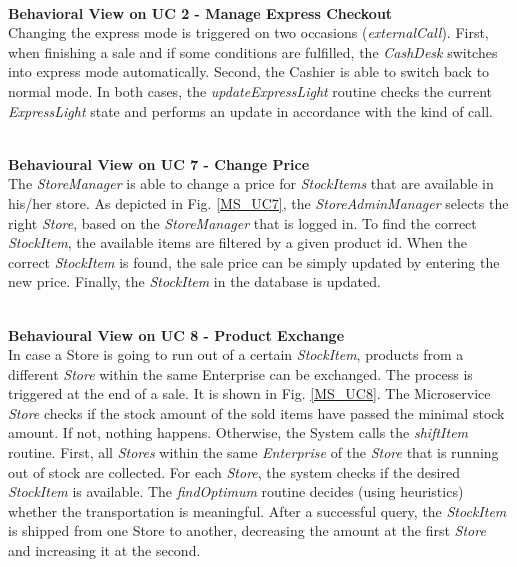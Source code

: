 		\noindent
		\\
		\textbf{Behavioral View on UC 2 - Manage Express Checkout} \\
		Changing the express mode is triggered on two occasions (\textit{externalCall}). First, when finishing a sale and if some conditions are fulfilled, the \textit{CashDesk} switches into express mode automatically. Second, the Cashier is able to switch back to normal mode. In both cases, the \textit{updateExpressLight} routine checks the current \textit{ExpressLight} state and performs an update in accordance with the kind of call.
		
       
		
		\noindent
		\\
		\textbf{Behavioural View on UC 7 - Change Price} \\
		The \textit{StoreManager} is able to change a price for \textit{StockItems} that are available in his/her store. As depicted in Fig. \ref{MS_UC7}, the \textit{StoreAdminManager} selects the right \textit{Store}, based on the \textit{StoreManager} that is logged in. To find the correct \textit{StockItem}, the available items are filtered by a given product id. When the correct \textit{StockItem} is found, the sale price can be simply updated by entering the new price. Finally, the \textit{StockItem} in the database is updated.
		
		\noindent
		\\
		\textbf{Behavioural View on UC 8 - Product Exchange} \\
		In case a Store is going to run out of a certain \textit{StockItem}, products from a different \textit{Store} within the same Enterprise can be exchanged. The process  is triggered at the end of a sale. It is shown in  Fig. \ref{MS_UC8}. The Microservice \textit{Store} checks if the stock amount of the sold items have passed the minimal stock amount. If not, nothing happens. Otherwise, the System calls the \textit{shiftItem} routine. First, all \textit{Stores} within the same \textit{Enterprise} of the \textit{Store} that is running out of stock are collected. For each \textit{Store}, the system checks if the desired \textit{StockItem} is available. The \textit{findOptimum} routine decides (using heuristics) whether the transportation is meaningful. After a successful query, the \textit{StockItem} is shipped from one Store to another, decreasing the amount at the first \textit{Store} and increasing it at the second.

